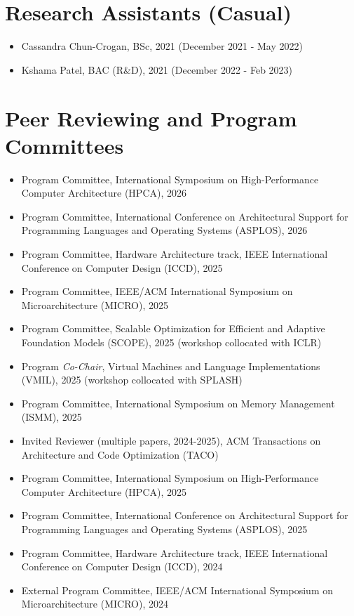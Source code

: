 \documentclass[singlecolumn,singlespace,11pt]{article}
\begin{document}
\section*{Research Assistants (Casual)}
\begin{itemize}
\item Cassandra Chun-Crogan, BSc, 2021 (December 2021 - May 2022)
\item Kshama Patel, BAC (R\&D), 2021 (December 2022 - Feb 2023)
\end{itemize}


\section*{Peer Reviewing and Program Committees}
\begin{itemize}
\item Program Committee, International Symposium on High-Performance Computer Architecture (HPCA), 2026
\item Program Committee, International Conference on Architectural Support for Programming Languages and Operating Systems (ASPLOS), 2026
\item Program Committee, Hardware Architecture track, IEEE International Conference on Computer Design (ICCD), 2025 
\item Program Committee, IEEE/ACM International Symposium on Microarchitecture (MICRO), 2025
\item Program Committee, Scalable Optimization for Efficient and Adaptive Foundation Models (SCOPE), 2025 (workshop collocated with ICLR)
\item Program \textit{Co-Chair}, Virtual Machines and Language Implementations (VMIL), 2025 (workshop collocated with SPLASH)
\item Program Committee, International Symposium on Memory Management (ISMM), 2025
\item Invited Reviewer (multiple papers, 2024-2025), ACM Transactions on Architecture and Code Optimization (TACO)
\item Program Committee, International Symposium on High-Performance Computer Architecture (HPCA), 2025
\item Program Committee, International Conference on Architectural Support for Programming Languages and Operating Systems (ASPLOS), 2025
\item Program Committee, Hardware Architecture track, IEEE International Conference on Computer Design (ICCD), 2024 
\item External Program Committee, IEEE/ACM International Symposium on Microarchitecture (MICRO), 2024

\end{itemize}
\end{document}
